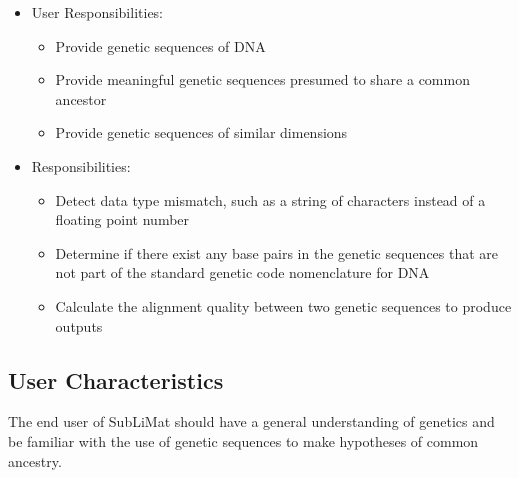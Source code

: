 \documentclass[12pt]{article}
\begin{document}
\begin{itemize}
\item User Responsibilities:
\begin{itemize}
\item Provide genetic sequences of DNA
\item Provide meaningful genetic sequences presumed to share a common ancestor
\item Provide genetic sequences of similar dimensions
\end{itemize}
\item \progname{} Responsibilities:
\begin{itemize}
\item Detect data type mismatch, such as a string of characters instead of a
  floating point number
\item Determine if there exist any base pairs in the genetic sequences that are
  not part of the standard genetic code nomenclature for DNA
\item Calculate the alignment quality between two genetic sequences to produce outputs
\end{itemize}
\end{itemize}


\subsection{User Characteristics} \label{SecUserCharacteristics}

The end user of SubLiMat should have a general understanding of genetics and be familiar 
with the use of genetic sequences to make hypotheses of common ancestry.
\end{document}
